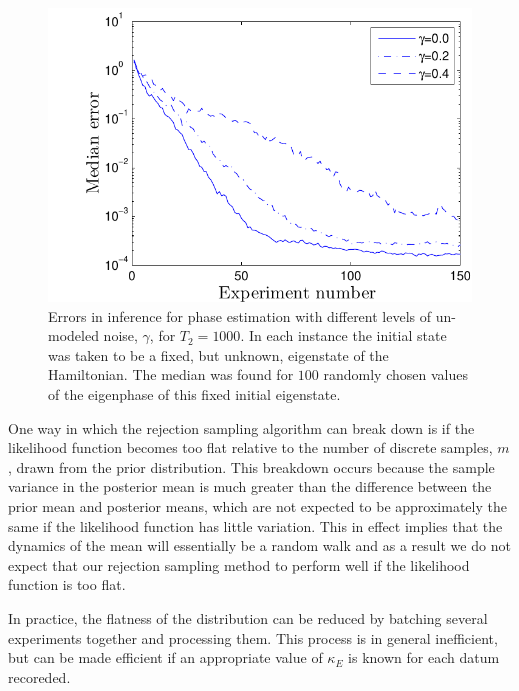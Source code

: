 \documentclass[aps,pra,amsmath,twocolumn,amssymb,superscriptaddress]{revtex4-1}
\begin{document}
\begin{figure}
    \begin{centering}
\includegraphics[width=0.45\linewidth]{Gammascale.pdf}
    \end{centering}
    \caption{\label{fig:gamma}
Errors in inference for phase estimation with different levels of un-modeled noise, $\gamma$, for $T_2=1000$.  In each instance the initial state was taken to be a fixed, but unknown, eigenstate of the Hamiltonian.  The median was found for $100$ randomly chosen values of the eigenphase of this fixed initial eigenstate.
    }
\end{figure}

One way in which the rejection sampling algorithm can break down is if the likelihood function becomes too flat relative to the number of discrete samples, $m$, drawn from the prior distribution.  This breakdown occurs because the sample variance in the posterior mean is much greater than the difference between the prior mean and posterior means, which are not expected to be approximately the same if the likelihood function has little variation.  This in effect implies that the dynamics of the mean will essentially be a random walk and as a result we do not expect that our rejection sampling method to perform well if the likelihood function is too flat.  

In practice, the flatness of the distribution can be reduced by batching several experiments together and processing them.  This process is in general inefficient, but can be made efficient if an appropriate value of $\kappa_E$ is known for each datum recoreded.
\end{document}
